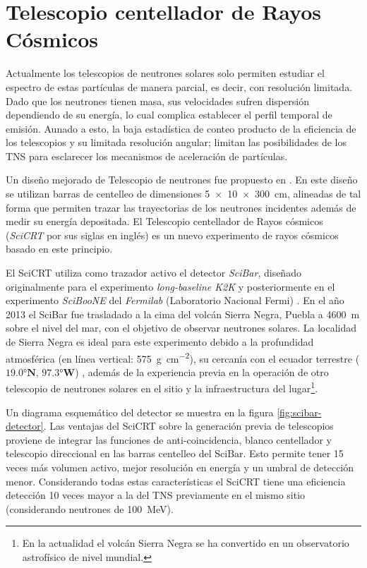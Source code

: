 
\chapter{Telescopio centellador de Rayos Cósmicos}
\label{chap:dos}

Actualmente los telescopios de neutrones solares solo permiten estudiar el espectro de estas partículas de manera parcial, es decir, con resolución limitada. Dado que los neutrones tienen masa, sus velocidades sufren dispersión dependiendo de su energía, lo cual complica establecer el perfil temporal de emisión. Aunado a esto, la baja estadística de conteo producto de la eficiencia de los telescopios y su limitada resolución angular; limitan las posibilidades de los TNS para esclarecer los mecanismos de aceleración de partículas.

Un diseño mejorado de Telescopio de neutrones fue propuesto en \cite{sako03}. En este diseño se utilizan barras de centelleo de dimensiones \SI[product-units=power]{5x10x300}{\cm}, alineadas de tal forma que permiten trazar las trayectorias de los neutrones incidentes además de medir su energía depositada. El Telescopio centellador de Rayos cósmicos (\emph{SciCRT} por sus siglas en inglés) es un nuevo experimento de rayos cósmicos basado en este principio.

El SciCRT utiliza como trazador activo el detector \emph{SciBar}, diseñado originalmente para el experimento \emph{long-baseline K2K} \cite{knitta04} y posteriormente en el experimento \emph{SciBooNE} del \emph{Fermilab} (Laboratorio Nacional Fermi) \cite{hiraide06}. En el año \num{2013} el SciBar fue trasladado a la cima del volcán Sierra Negra, Puebla a \SI{4600}{\metre} sobre el nivel del mar, con el objetivo de observar neutrones solares. La localidad de Sierra Negra es ideal para este experimento debido a la profundidad atmosférica (en línea vertical: \SI{575}{\gram\per\square\centi\metre}), su cercanía con el ecuador terrestre ($\ang{19.0}\mathbf{N}$, $\ang{97.3}\mathbf{W}$) , además de la experiencia previa en la operación de otro telescopio de neutrones solares en el sitio y la infraestructura del lugar\footnote{En la actualidad el volcán Sierra Negra se ha convertido en un observatorio astrofísico de nivel mundial.}.

Un diagrama esquemático del detector se muestra en la figura \ref{fig:scibar-detector}. Las ventajas del SciCRT sobre la generación previa de telescopios proviene de integrar las funciones de anti-coincidencia, blanco centellador y telescopio direccional en las barras centelleo del SciBar. Esto permite tener \num{15} veces más volumen activo, mejor resolución en energía y un umbral de detección menor. Considerando todas estas características el SciCRT tiene una eficiencia detección \num{10} veces mayor a la del TNS previamente en el mismo sitio \cite{ynagai14} (considerando neutrones de \SI{100}{\mega\electronvolt}).

